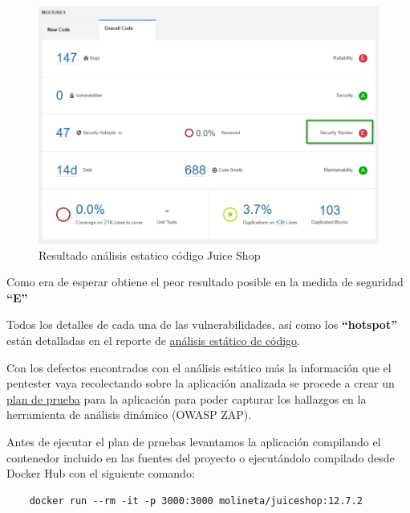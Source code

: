 \begin{figure}[!htb]
    \centering  
    \captionsetup{width=1\linewidth}  
    \includegraphics[width=\linewidth]{./imagenes/08_AnalisisEstatico_JuiceShop.png}
    \caption{Resultado análisis estatico código Juice Shop}  
    \label{fig:23}
\end{figure}

Como era de esperar obtiene el peor resultado posible en la medida de seguridad \textbf{“E”}

Todos los detalles de cada una de las vulnerabilidades, así como los \textbf{“hotspot”} están detalladas en el reporte de 
\href{https://github.com/M0l1n3ta/PFG/blob/master/Reportes/An%C3%A1lisis estatico de c%C3%B3digo/ReporteAnalisisestatico_JuiceShop.docx}{análisis estático de código}.

Con los defectos encontrados con el análisis estático más la información que el pentester vaya recolectando sobre la aplicación 
analizada se procede a crear un \href{https://github.com/M0l1n3ta/PFG/blob/master/Scripts/Plan Pruebas/PlanPruebas_OWASP_JuiceShop.ps1}{plan de prueba} 
para la aplicación para poder capturar los hallazgos en la herramienta de análisis dinámico (OWASP ZAP).

\newpage

Antes de ejecutar el plan de pruebas levantamos la aplicación compilando el contenedor incluido en las fuentes 
del proyecto o ejecutándolo compilado desde Docker Hub con el siguiente comando:

\begin{verbatim}
    docker run --rm -it -p 3000:3000 molineta/juiceshop:12.7.2
\end{verbatim}

